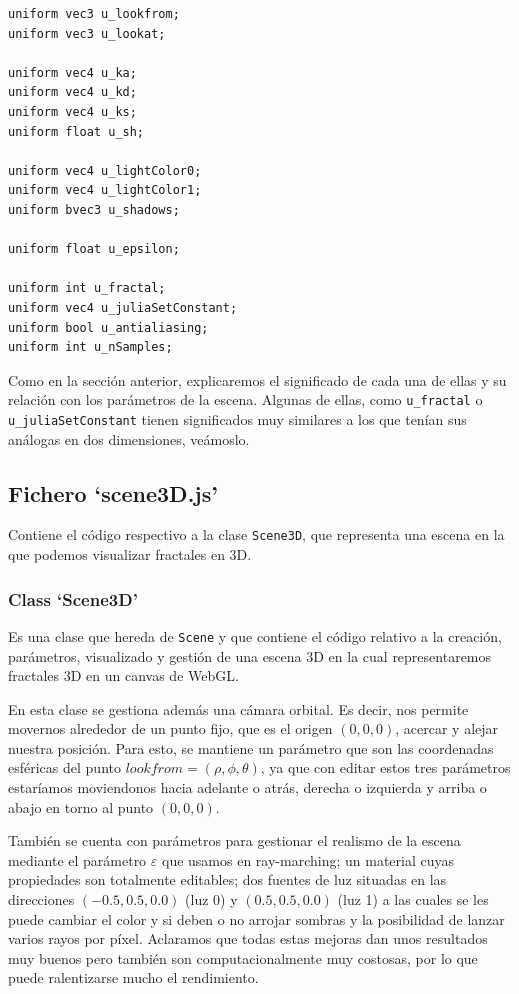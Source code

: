 \begin{lstlisting}
uniform vec3 u_lookfrom;
uniform vec3 u_lookat;

uniform vec4 u_ka;
uniform vec4 u_kd;
uniform vec4 u_ks;
uniform float u_sh;

uniform vec4 u_lightColor0;
uniform vec4 u_lightColor1;
uniform bvec3 u_shadows;

uniform float u_epsilon;

uniform int u_fractal;
uniform vec4 u_juliaSetConstant;
uniform bool u_antialiasing;
uniform int u_nSamples;
\end{lstlisting}

Como en la sección anterior, explicaremos el significado de cada una de ellas y su relación con los parámetros de la escena. Algunas de ellas, como \verb|u_fractal| o \verb|u_juliaSetConstant| tienen significados muy similares a los que tenían sus análogas en dos dimensiones, veámoslo.

\subsection{Fichero `scene3D.js'}

Contiene el código respectivo a la clase \verb|Scene3D|, que representa una escena en la que podemos visualizar fractales en 3D.

\subsubsection{Class `Scene3D'}

Es una clase que hereda de \verb|Scene| y que contiene el código relativo a la creación, parámetros, visualizado y gestión de una escena 3D en la cual representaremos fractales 3D en un canvas de WebGL. 

En esta clase se gestiona además una cámara orbital. Es decir, nos permite movernos alrededor de un punto fijo, que es el origen $(0,0,0)$, acercar y alejar nuestra posición. Para esto, se mantiene un parámetro que son las coordenadas esféricas del punto $lookfrom=(\rho,\phi,\theta)$, ya que con editar estos tres parámetros estaríamos moviendonos hacia adelante o atrás, derecha o izquierda y arriba o abajo en torno al punto $(0,0,0)$.

También se cuenta con parámetros para gestionar el realismo de la escena mediante el parámetro $\varepsilon$ que usamos en ray-marching; un material cuyas propiedades son totalmente editables; dos fuentes de luz situadas en las direcciones $(-0.5, 0.5, 0.0)$ (luz 0) y $(0.5, 0.5, 0.0)$ (luz 1) a las cuales se les puede cambiar el color y si deben o no arrojar sombras y la posibilidad de lanzar varios rayos por píxel. Aclaramos que todas estas mejoras dan unos resultados muy buenos pero también son computacionalmente muy costosas, por lo que puede ralentizarse mucho el rendimiento.

